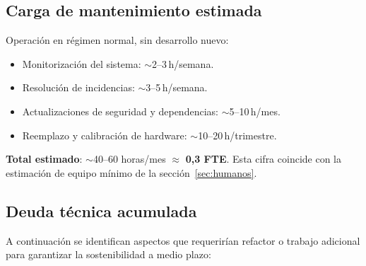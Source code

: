 \subsection{Carga de mantenimiento estimada}

Operaci\'on en r\'egimen normal, sin desarrollo nuevo:

\begin{itemize}[leftmargin=*]
    \item Monitorizaci\'on del sistema: $\sim$2--3\,h/semana.
    \item Resoluci\'on de incidencias: $\sim$3--5\,h/semana.
    \item Actualizaciones de seguridad y dependencias: $\sim$5--10\,h/mes.
    \item Reemplazo y calibraci\'on de hardware: $\sim$10--20\,h/trimestre.
\end{itemize}

\textbf{Total estimado}: $\sim$40--60 horas/mes $\approx$ \textbf{0,3 FTE}.
Esta cifra coincide con la estimaci\'on de equipo m\'inimo de la
secci\'on~\ref{sec:humanos}.

\subsection{Deuda t\'ecnica acumulada}

A continuaci\'on se identifican aspectos que requerir\'ian refactor o
trabajo adicional para garantizar la sostenibilidad a medio plazo:

